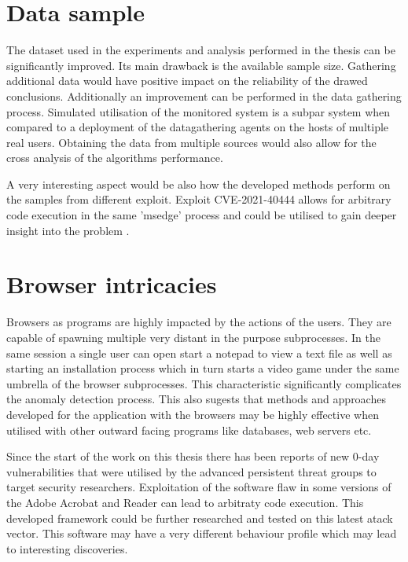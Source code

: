\documentclass[a4paper,twoside,12pt]{book}
\begin{document}
\section{Data sample}

The dataset used in the experiments and analysis performed in the thesis can be significantly 
improved. Its main drawback is the available sample size. Gathering additional data would have
positive impact on the reliability of the drawed conclusions. Additionally an improvement 
can be performed in the data gathering process. Simulated utilisation of the monitored system
is a subpar system when compared to a deployment of the datagathering agents on the hosts of 
multiple real users. Obtaining the data from multiple sources would also allow for the cross
analysis of the algorithms performance. 

A very interesting aspect would be also how the developed methods perform on the samples from 
different exploit. Exploit CVE-2021-40444 allows for arbitrary code execution in the same 'msedge'
process and could be utilised to gain deeper insight into the problem \cite{bib:newEdgeExploit}.

\section{Browser intricacies}

Browsers as programs are highly impacted by the actions of the users. They are capable of spawning
multiple very distant in the purpose subprocesses. In the same session a single user can open start
a notepad to view a text file as well as starting an installation process which in turn starts a 
video game under the same umbrella of the browser subprocesses. This characteristic significantly
complicates the anomaly detection process. This also sugests that methods and approaches developed
for the application with the browsers may be highly effective when utilised with other outward 
facing programs like databases, web servers etc.

Since the start of the work on this thesis there has been reports of new 0-day vulnerabilities that were
utilised by the advanced persistent threat groups to target security researchers. Exploitation of the
software flaw in some versions of the Adobe Acrobat and Reader can lead to arbitraty code execution\cite{bib:AdobeExploit}.
This developed framework could be further researched and tested on this latest atack vector. This 
software may have a very different behaviour profile which may lead to interesting discoveries.
\end{document}
